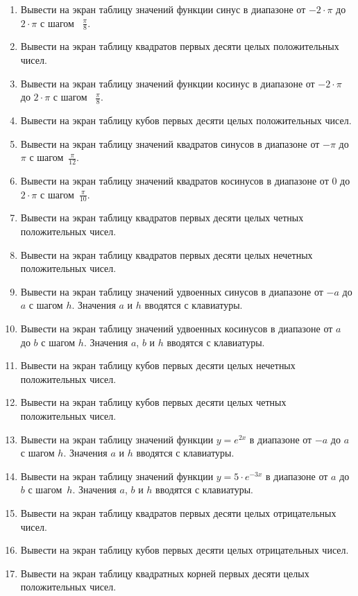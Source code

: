\begin{enumerate}
\item Вывести на экран таблицу значений функции синус в диапазоне от  $-2\cdot \pi $ до  $2\cdot \pi $  с шагом~
$\frac{\pi}{8}$.
\item Вывести на экран таблицу квадратов первых десяти целых положительных чисел.
\item Вывести на экран таблицу значений функции косинус в диапазоне от  $-2\cdot \pi $  до  $2\cdot \pi $  с шагом~
$\frac{\pi}{8}$.
\item Вывести на экран таблицу кубов первых десяти целых положительных чисел.
\item Вывести на экран таблицу значений квадратов синусов в диапазоне от  $-\pi$  до  $\pi$  с шагом~$\frac{\pi}{12}$.
\item Вывести на экран таблицу значений квадратов косинусов в диапазоне от 0 до $2\cdot \pi$ с шагом~$\frac{\pi}{10}$.
\item Вывести на экран таблицу квадратов первых десяти целых четных положительных чисел.
\item Вывести на экран таблицу квадратов первых десяти целых нечетных положительных чисел.
\item Вывести на экран таблицу значений удвоенных синусов в диапазоне от $-a$ до $a$ с шагом $h$. Значения $a$ и
 $h$  вводятся с клавиатуры.
\item Вывести на экран таблицу значений удвоенных косинусов в диапазоне от  $a$  до  $b$  с шагом  $h$. Значения  $a$,
 $b$  и  $h$  вводятся с клавиатуры.
\item Вывести на экран таблицу кубов первых десяти целых нечетных положительных чисел.
\item Вывести на экран таблицу кубов первых десяти целых четных положительных чисел.
\item Вывести на экран таблицу значений функции  $y=e^{2x}$ в диапазоне от  $-a$  до  $a$  с шагом  $h$. Значения  $a$ 
и  $h$  вводятся с клавиатуры.
\item Вывести на экран таблицу значений функции  $y=5\cdot e^{-3x}$  в диапазоне от  $a$  до  $b$  с шагом~$h$.
Значения  $a$,  $b$  и  $h$  вводятся с клавиатуры.
\item Вывести на экран таблицу квадратов первых десяти целых отрицательных чисел.
\item Вывести на экран таблицу кубов первых десяти целых отрицательных чисел.
\item Вывести на экран таблицу квадратных корней первых десяти целых положительных чисел.

\end{enumerate}
